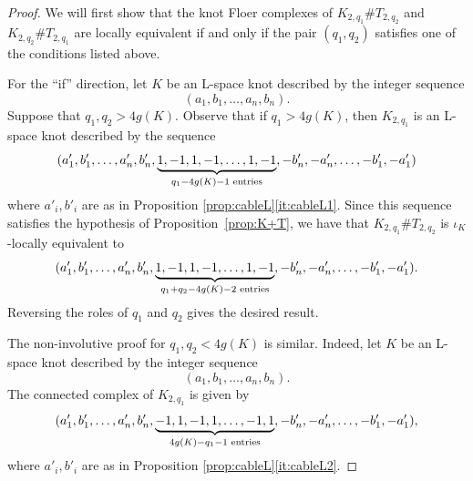 \documentclass[11pt, reqno]{amsart}
\theoremstyle{definition}
\theoremstyle{remark}
\numberwithin{equation}{section}
\begin{document}
\begin{proof}
We will first show that the knot Floer complexes of $K_{2, q_1} \# T_{2, q_2}$ and $K_{2, q_2} \# T_{2, q_1}$ are locally equivalent if and only if the pair $(q_1, q_2)$ satisfies one of the conditions listed above.

For the ``if'' direction, let $K$ be an L-space knot described by the integer sequence $$(a_1, b_1, \dots, a_n, b_n).$$
 Suppose that $q_1, q_2 > 4g(K)$. Observe that if $q_1> 4g(K)$, then $K_{2,q_1}$ is an L-space knot described by the sequence 
\[ (a'_1, b'_1, \dots, a'_n, b'_n, \underbrace{1, -1, 1, -1, \dots, 1, -1}_{q_1-4g(K)-1\textup{ entries}}, -b'_n, -a'_n, \dots, -b'_1, -a'_1) \]
where $a'_i, b'_i$ are as in Proposition \ref{prop:cableL}\eqref{it:cableL1}. Since this sequence satisfies the hypothesis of Proposition~\ref{prop:K+T}, we have that $K_{2,q_1} \# T_{2, q_2}$ is $\iota_K$-locally equivalent to 
\[ (a'_1, b'_1, \dots, a'_n, b'_n, \underbrace{1, -1, 1, -1, \dots, 1, -1}_{q_1+q_2-4g(K)-2\textup{ entries}}, -b'_n, -a'_n, \dots, -b'_1, -a'_1). \]
Reversing the roles of $q_1$ and $q_2$ gives the desired result.

The non-involutive proof for $q_1, q_2 < 4g(K)$ is similar. Indeed, let $K$ be an L-space knot described by the integer sequence $$(a_1, b_1, \dots, a_n, b_n).$$ The connected complex of  $K_{2, q_1}$ is given by
\[ (a'_1, b'_1, \dots, a'_n, b'_n, \underbrace{-1, 1, -1, 1, \dots, -1, 1}_{4g(K)-q_1-1\textup{ entries}}, -b'_n, -a'_n, \dots, -b'_1, -a'_1), \]
where $a'_i, b'_i$ are as in Proposition \ref{prop:cableL}\eqref{it:cableL2}. 



\end{proof}
\end{document}
